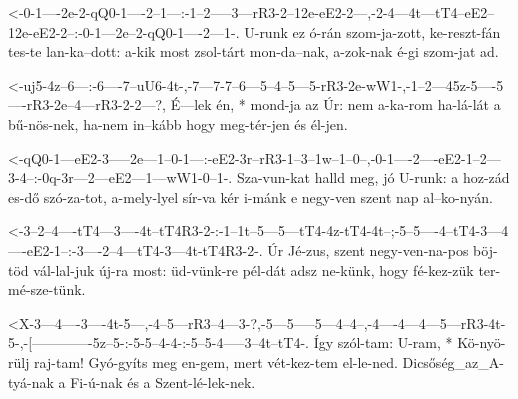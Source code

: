 



  {<-0-1----2e-2-qQ0-1----2--1---:-1--2-----3---rR3-2--12e-eE2-2---,-2-4---4t---tT4--eE2--12e-eE2-2--:-0-1---2e--2-qQ0-1----2---1-.}
  {  U-runk ez ó-rán szom-ja-zott, ke-reszt-fán tes-te lan-ka--dott: a-kik most zsol-tárt mon-da--nak, a-zok-nak é-gi  szom-jat ad.}

  {<-uj5-4z--6---:-6----7--uU6-4t-,-7---7-7--6---5--4--5---5-rR3-2e-wW1-,-1--2---45z-5----5----rR3-2e--4---rR3-2-2---?,}
  {  É---lek én, * mond-ja az  Úr:  nem a-ka-rom ha-lá-lát a bű-nös-nek,  ha-nem in--kább hogy meg-tér-jen és  él-jen.}






  {<-qQ0-1---eE2-3-----2e---1--0-1---:-eE2-3r--rR3-1--3--1w--1--0--,-0-1----2----eE2-1--2---3-4--:-0q-3r---2---eE2---1---wW1-0--1-.}
  {  Sza-vun-kat halld meg, jó U-runk: a   hoz-zád es-dő szó-za-tot, a-mely-lyel sír-va kér i-mánk e  negy-ven szent nap al--ko-nyán.}


  {<-3--2--4----tT4---3----4t--tT4R3-2-:-1--1t--5---5---tT4-4z-tT4-4t--;-5--5----4--tT4-3---4----eE2-1--:-3----2--4---tT4-3---4t-tT4R3-2-.}
  {  Úr Jé-zus, szent negy-ven-na-pos    böj-töd vál-lal-juk új-ra most: üd-vünk-re pél-dát adsz ne-künk, hogy fé-kez-zük ter-mé-sze-tünk.}

  {<X-3---4----3----4t-5---,-4--5---rR3--4---3-?,-5---5-----5---4--4--,-4----4---4---5---rR3-4t-5-,-[-------------5z--5-:-5-5--4-4-:-5--5-4-----3--4t--tT4-.}
  {   Így szól-tam: U-ram, * Kö-nyö-rülj raj-tam! Gyó-gyíts meg en-gem, mert vét-kez-tem el-le-ned. Dicsőség_az_A-tyá-nak a Fi-ú-nak és a Szent-lé-lek-nek.}


